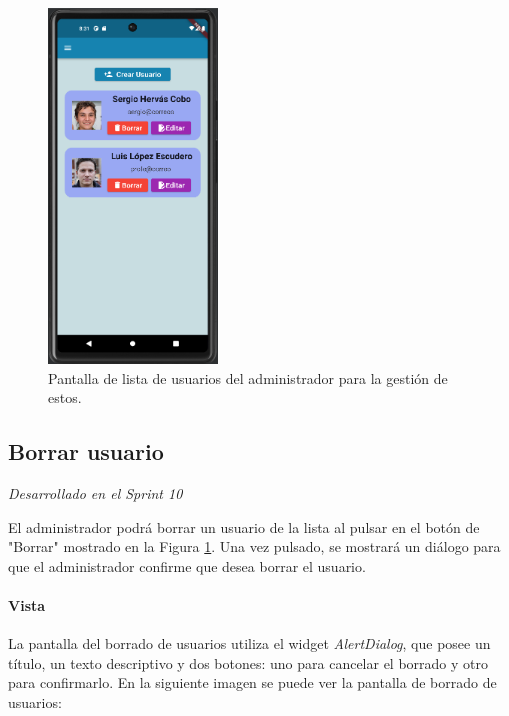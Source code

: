 \begin{figure}[H]
  \centering
  \includegraphics[width=0.4\textwidth]{imagenes/c7/listausuarios.png}
  \caption{Pantalla de lista de usuarios del administrador para la gestión de estos.} 
  \label{fig:listausuarios}
\end{figure}

\subsection{Borrar usuario} 

\textit{Desarrollado en el Sprint 10}

El administrador podrá borrar un usuario de la lista al pulsar en el botón de "Borrar" mostrado en la Figura \ref{fig:listausuarios}.
Una vez pulsado, se mostrará un diálogo para que el administrador confirme que desea borrar el usuario.

\paragraph*{Vista}
La pantalla del borrado de usuarios utiliza el widget \textit{AlertDialog}, que posee
un título, un texto descriptivo y dos botones: uno para cancelar el borrado y otro para confirmarlo.
En la siguiente imagen se puede ver la pantalla de borrado de usuarios:


